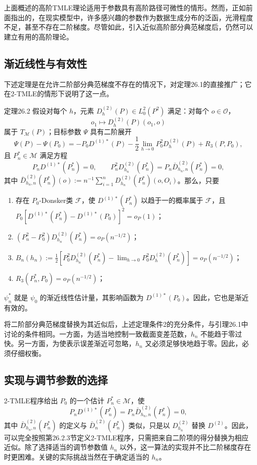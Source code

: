 上面概述的高阶TMLE理论适用于参数具有高阶路径可微性的情形。然而，正如前面指出的，在现实模型中，许多感兴趣的参数作为数据生成分布的泛函，光滑程度不足，甚至不存在二阶梯度。尽管如此，引入近似高阶部分典范梯度后，仍然可以建立有用的高阶理论。

\subsection{渐近线性与有效性}

下述定理是在允许二阶部分典范梯度不存在的情况下，对定理26.1的直接推广；它在2-TMLE的情形下说明了这一点。

\begin{bookresult}{定理}{26.2}
假设对每个 $h$，元素 $D_h^{(2)}(P)\in L_0^2(P^2)$ 满足：对每个 $o\in\mathcal O$，
\[
o_1\mapsto D_h^{(2)}(P)(o_1,o)
\]
属于 $T_{\mathcal M}(P)$；目标参数 $\Psi$ 具有二阶展开
\[
\Psi(P)-\Psi(P_0)=-P_0D^{(1)*}(P)-\frac12\lim_{h\to0}P_0^2D_h^{(2)}(P)+R_3(P,P_0),
\]
且 $P_n^*\in\mathcal M$ 满足方程
\[
P_nD^{(1)*}(P_n^*)=0,\qquad
P_n^2D_{h_n}^{(2)}(P_n^*)=P_n\bar D_{h_n,n}^{(2)}(P_n^*)=0,
\]
其中 $\bar D_{h_n,n}^{(2)}(P_n^*)(o):=n^{-1}\sum_{i=1}^nD_{h_n}^{(2)}(P_n^*)(o,O_i)$。那么，只要
\begin{enumerate}
\item 存在 $P_0$-Donsker类 $\mathcal F$，使 $D^{(1)*}(P_n^*)$ 以趋于一的概率属于 $\mathcal F$，且 $P_0[D^{(1)*}(P_n^*)-D^{(1)*}(P_0)]^2=o_P(1)$；
\item $(P_n^2-P_0^2)D_{h_n}^{(2)}(P_n^*)=o_P(n^{-1/2})$；
\item $B_n(h_n):=\frac12[P_0^2D_{h_n}^{(2)}(P_n^*)-\lim_{h\to0}P_0^2D_h^{(2)}(P_n^*)]=o_P(n^{-1/2})$；
\item $R_3(P_n^*,P_0)=o_P(n^{-1/2})$；
\end{enumerate}
$\psi_n^*$ 就是 $\psi_0$ 的渐近线性估计量，其影响函数为 $D^{(1)*}(P_0)$。因此，它也是渐近有效的。
\end{bookresult}

将二阶部分典范梯度替换为其近似后，上述定理条件2的充分条件，与引理26.1中讨论的条件相同。一方面，为适当地控制一致截面变差范数，$h_n$ 不能趋于零过快。另一方面，为使表示误差渐近可忽略，$h_n$ 又必须足够快地趋于零。因此，必须仔细权衡。

\subsection{实现与调节参数的选择}

2-TMLE程序给出 $P_0$ 的一个估计 $P_n^*\in\mathcal M$，使
\[
P_nD^{(1)*}(P_n^*)=P_n\bar D_{h_n,n}^{(2)}(P_n^*)=0,
\]
其中 $\bar D_{h_n,n}^{(2)}(P_n^*)$ 的定义与 $\bar D_n^{(2)}(P_n^*)$ 类似，只是以 $D_{h_n}^{(2)}$ 替换 $D^{(2)}$。因此，可以完全按照第26.2.3节定义2-TMLE程序，只需把来自二阶项的得分替换为相应近似。除了选择适当的调节参数值 $h_n$ 以外，这一算法的实现并不比二阶梯度存在时更困难。关键的实际挑战当然在于确定适当的 $h_n$。

